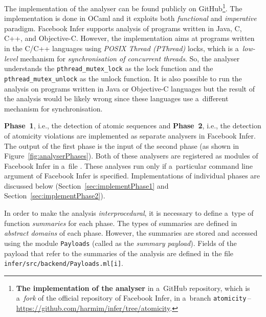 The implementation of the analyser can be found publicly on
GitHub\footnote{\textbf{The implementation of the analyser} in a~GitHub
repository, which is a~\emph{fork} of the official repository of Facebook
Infer, in a~branch
\texttt{atomicity}\,--\,\url{https://github.com/harmim/infer/tree/atomicity}.}.
The implementation is done in OCaml and it exploits both \emph{functional}
and \emph{imperative} paradigm. Facebook Infer supports analysis of
programs written in Java, C, C++, and Objective-C. However, the implementation
aims at programs written in the C/C++ languages using \emph{POSIX Thread
(PThread)} locks, which is a~\emph{low-level} mechanism for
\emph{synchronisation of concurrent threads}. So, the analyser understands
the \texttt{pthread\_mutex\_lock} as the lock function and the
\texttt{pthread\_mutex\_unlock} as the unlock function. It is also possible
to run the analysis on programs written in Java or Objective-C languages but
the result of the analysis would be likely wrong since these languages use
a~different mechanism for synchronisation.

\textbf{Phase~1}, i.e., the detection of atomic sequences and \textbf{Phase~2},
i.e., the detection of atomicity violations are implemented as separate
analysers in Facebook Infer. The output of the first phase is the input of
the second phase (as shown in Figure~\ref{fig:analyserPhases}). Both of
these analysers are registered as modules of Facebook Infer in a~file
. These analyses run only
if a~particular command line argument of Facebook Infer is specified.
Implementations of individual phases are discussed below
(Section~\ref{sec:implementPhase1} and Section~\ref{sec:implementPhase2}).

In order to make the analysis \emph{interprocedural}, it is necessary to
define a~type of function \emph{summaries} for each phase.
The types of summaries are defined in \emph{abstract domains} of
each phase. However, the summaries are stored and accessed using
the module \texttt{Payloads} (called as the \emph{summary payload}).
Fields of the payload that refer to the summaries of the analysis are
defined in the file \texttt{infer/src/backend/Payloads.ml[i]}.

